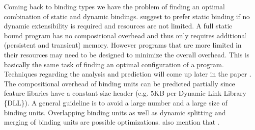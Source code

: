 Coming back to binding types we have the problem of finding an optimal combination of static and dynamic bindings. \citet{CombiningStaticandDynamicFeatureBinding} suggest to prefer static binding if no dynamic extensibility is required and resources are not limited. A full static bound program has no compositional overhead and thus only requires additional (persistent and transient) memory. However programs that are more limited in their resources may need to be designed to minimize the overall overhead. This is basically the same task of finding an optimal configuration of a program. Techniques regarding the analysis and prediction will come up later in the paper . The compositional overhead of binding units can be predicted partially since feature libaries have a constant size header (e.g. 5KB per Dynamic Link Library \{DLL\}). A general guideline is to avoid a large number and a large size of binding units. Overlapping binding units as well as dynamic splitting and merging of binding units are possible optimizations. \citet{CombiningStaticandDynamicFeatureBinding} also mention that .